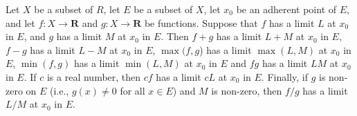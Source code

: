 \begin{proposition}\label{9.3.14}
    Let \(X\) be a subset of \(R\), let \(E\) be a subset of \(X\), let \(x_0\) be an adherent point of \(E\), and let \(f : X \to \mathbf{R}\) and \(g : X \to \mathbf{R}\) be functions.
    Suppose that \(f\) has a limit \(L\) at \(x_0\) in \(E\), and \(g\) has a limit \(M\) at \(x_0\) in \(E\).
    Then \(f + g\) has a limit \(L + M\) at \(x_0\) in \(E\), \(f - g\) has a limit \(L - M\) at \(x_0\) in \(E\), \(\max(f, g\)) has a limit \(\max(L, M)\) at \(x_0\) in \(E\), \(\min(f, g)\) has a limit \(\min(L, M)\) at \(x_0\) in \(E\) and \(fg\) has a limit \(LM\) at \(x_0\) in \(E\).
    If \(c\) is a real number, then \(cf\) has a limit \(cL\) at \(x_0\) in \(E\).
    Finally, if \(g\) is non-zero on \(E\) (i.e., \(g(x) \neq 0\) for all \(x \in E\)) and \(M\) is non-zero, then \(f / g\) has a limit \(L / M\) at \(x_0\) in \(E\).
\end{proposition}

